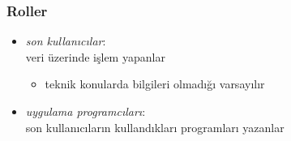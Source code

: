 \documentclass[dvipsnames]{beamer}
\theoremstyle{definition}
\theoremstyle{example}
\theoremstyle{plain}
\begin{document}
\begin{frame}
  \frametitle{Roller}

  \begin{itemize}
    \item \emph{son kullanıcılar}:\\
      veri üzerinde işlem yapanlar
    \begin{itemize}
      \item teknik konularda bilgileri olmadığı varsayılır
    \end{itemize}

    \pause
    \bigskip
    \item \emph{uygulama programcıları}:\\
      son kullanıcıların kullandıkları programları yazanlar
  \end{itemize}
\end{frame}
\end{document}
